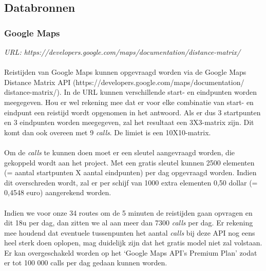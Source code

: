 \documentclass[ps,a4paper,oneside]{report}
\begin{document}
\subsection{Databronnen}
\subsubsection{Google Maps}
\textit{URL: https://developers.google.com/maps/documentation/distance-matrix/}\\\\
Reistijden van Google Maps kunnen opgevraagd worden via de Google Maps Distance Matrix API (https://developers.google.com/maps/documentation/\\distance-matrix/). In de URL kunnen verschillende start- en eindpunten worden meegegeven. Hou er wel rekening mee dat er voor elke combinatie van start- en eindpunt een reistijd wordt opgenomen in het antwoord. Als er dus 3 startpunten en 3 eindpunten worden meegegeven, zal het resultaat een 3X3-matrix zijn. Dit komt dan ook overeen met 9 \textit{calls}. De limiet is een 10X10-matrix.\\\\
Om de \textit{calls} te kunnen doen moet er een sleutel aangevraagd worden, die gekoppeld wordt aan het project. Met een gratis sleutel kunnen 2500 elementen (= aantal startpunten X aantal eindpunten) per dag opgevraagd worden. Indien dit overschreden wordt, zal er per schijf van 1000 extra elementen 0,50 dollar (= 0,4548 euro) aangerekend worden.\\\\
Indien we voor onze 34 routes om de 5 minuten de reistijden gaan opvragen en dit 18u per dag, dan zitten we al aan meer dan 7300 \textit{calls} per dag. Er rekening mee houdend dat eventuele tussenpunten het aantal \textit{calls} bij deze API nog eens heel sterk doen oplopen, mag duidelijk zijn dat het gratis model niet zal volstaan. Er kan overgeschakeld worden op het ‘Google Maps API’s Premium Plan’ zodat er tot 100 000 calls per dag gedaan kunnen worden.
\end{document}
